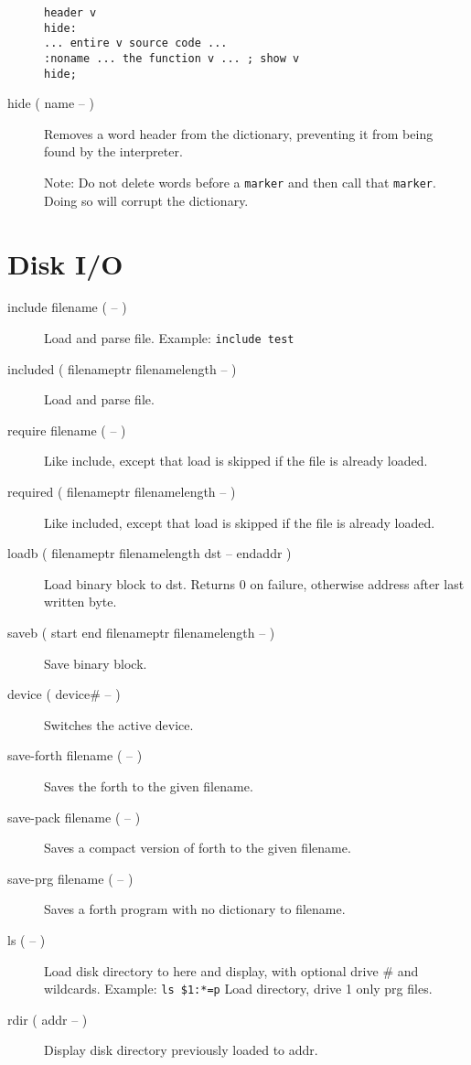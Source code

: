 \begin{description}
\begin{verbatim}
header v
hide:
... entire v source code ...
:noname ... the function v ... ; show v
hide;
\end{verbatim}

\item[hide ( name -- )] Removes a word header from the dictionary, preventing it from being found by the interpreter.

	Note: Do not delete words before a \texttt{marker} and then call that \texttt{marker}. Doing so will corrupt the dictionary.
\end{description}

\section{Disk I/O}

\begin{description}
\item[include filename ( -- )] Load and parse file. Example: \texttt{include test}
\item[included ( filenameptr filenamelength -- )] Load and parse file.
\item[require filename ( -- )] Like include, except that load is skipped if the file is already loaded.
\item[required ( filenameptr filenamelength -- )] Like included, except that load is skipped if the file is already loaded.
\item[loadb ( filenameptr filenamelength dst -- endaddr )] Load binary block to dst. Returns 0 on failure, otherwise address after last written byte.
\item[saveb ( start end filenameptr filenamelength -- )] Save binary block.
\item[device ( device\# -- )] Switches the active device.
\item[save-forth filename ( -- )] Saves the forth to the given filename.
\item[save-pack filename ( -- )] Saves a compact version of forth to the given filename.
\item[save-prg filename ( -- )] Saves a forth program with no dictionary to filename.
\item[ls ( -- )] Load disk directory to here and display, with optional drive \# and wildcards. Example: \texttt{ls \$1:*=p} Load directory, drive 1 only prg files.
\item[rdir ( addr -- )] Display disk directory previously loaded to addr.
\end{description}

